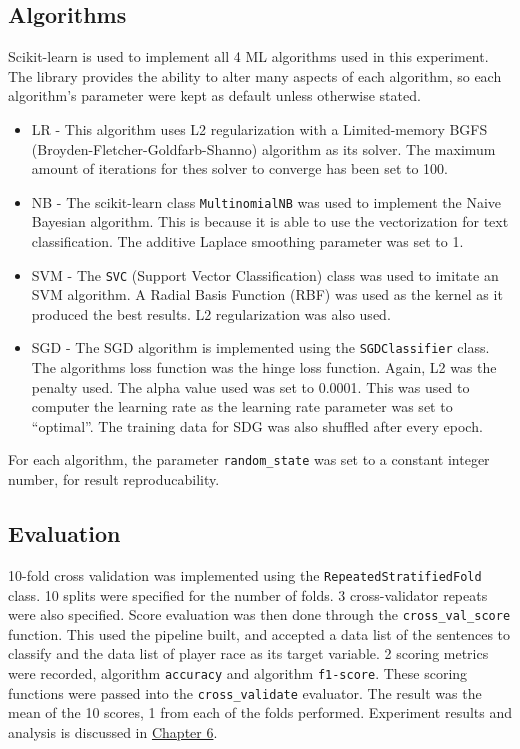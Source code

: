 \documentclass[oneside,12pt]{Classes/RoboticsLaTeX}
\begin{document}
\subsection{Algorithms}
\label{sec:algor}
Scikit-learn is used to implement all 4 ML algorithms used in this experiment. The library provides the ability to alter many aspects of each algorithm, so each algorithm's parameter were kept as default unless otherwise stated.
\begin{itemize}
  \item LR - This algorithm uses L2 regularization with a Limited-memory BGFS (Broyden-Fletcher-Goldfarb-Shanno) algorithm as its solver. The maximum amount of iterations for thes solver to converge has been set to 100.
  \item NB - The scikit-learn class \texttt{MultinomialNB} was used to implement the Naive Bayesian algorithm. This is because it is able to use the vectorization for text classification. The additive Laplace smoothing parameter was set to 1.
  \item SVM - The \texttt{SVC} (Support Vector Classification) class was used to imitate an SVM algorithm. A Radial Basis Function (RBF) was used as the kernel as it produced the best results. L2 regularization was also used.
  \item SGD - The SGD algorithm is implemented using the \texttt{SGDClassifier} class. The algorithms loss function was the hinge loss function. Again, L2 was the penalty used. The alpha value used was set to 0.0001. This was used to computer
              the learning rate as the learning rate parameter was set to ``optimal''. The training data for SDG was also shuffled after every epoch.
\end{itemize}
For each algorithm, the parameter \texttt{random\_state} was set to a constant integer number, for result reproducability.
\subsection{Evaluation}
10-fold cross validation was implemented using the \texttt{RepeatedStratifiedFold} class. 10 splits were specified for the number of folds. 3 cross-validator repeats were also specified. Score evaluation was then done through the \texttt{cross\_val\_score}
function. This used the pipeline built, and accepted a data list of the sentences to classify and the data list of player race as its target variable. 2 scoring metrics were recorded, algorithm \texttt{accuracy} and algorithm \texttt{f1-score}. These scoring functions
were passed into the \texttt{cross\_validate} evaluator. The result was the mean of the 10 scores, 1 from each of the folds performed. Experiment results and analysis is discussed in \hyperref[chap:results]{Chapter 6}.
\end{document}
